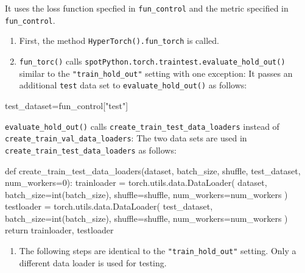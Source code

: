 \documentclass[
  letterpaper,
  DIV=11,
  numbers=noendperiod]{scrreprt}
\newenvironment{Shaded}{\begin{snugshade}}{\end{snugshade}}
\newcommand{\NormalTok}[1]{\textcolor[rgb]{0.00,0.23,0.31}{#1}}
\providecommand{\tightlist}{%
  \setlength{\itemsep}{0pt}\setlength{\parskip}{0pt}}\usepackage{longtable,booktabs,array}
\begin{document}
It uses the loss function specfied in \texttt{fun\_control} and the
metric specified in \texttt{fun\_control}.

\begin{enumerate}
\def\labelenumi{\arabic{enumi}.}
\tightlist
\item
  First, the method \texttt{HyperTorch().fun\_torch} is called.
\item
  \texttt{fun\_torc()} calls
  \texttt{spotPython.torch.traintest.evaluate\_hold\_out()} similar to
  the \texttt{"train\_hold\_out"} setting with one exception: It passes
  an additional \texttt{test} data set to \texttt{evaluate\_hold\_out()}
  as follows:
\end{enumerate}

\begin{Shaded}
\begin{Highlighting}[]
\NormalTok{test\_dataset=fun\_control["test"]}
\end{Highlighting}
\end{Shaded}

\texttt{evaluate\_hold\_out()} calls
\texttt{create\_train\_test\_data\_loaders} instead of
\texttt{create\_train\_val\_data\_loaders}: The two data sets are used
in \texttt{create\_train\_test\_data\_loaders} as follows:

\begin{Shaded}
\begin{Highlighting}[]
\NormalTok{def create\_train\_test\_data\_loaders(dataset, batch\_size, shuffle, test\_dataset, }
\NormalTok{        num\_workers=0):}
\NormalTok{    trainloader = torch.utils.data.DataLoader(}
\NormalTok{        dataset, batch\_size=int(batch\_size), shuffle=shuffle, }
\NormalTok{        num\_workers=num\_workers}
\NormalTok{    )}
\NormalTok{    testloader = torch.utils.data.DataLoader(}
\NormalTok{        test\_dataset, batch\_size=int(batch\_size), shuffle=shuffle, }
\NormalTok{        num\_workers=num\_workers}
\NormalTok{    )}
\NormalTok{    return trainloader, testloader}
\end{Highlighting}
\end{Shaded}

\begin{enumerate}
\def\labelenumi{\arabic{enumi}.}
\setcounter{enumi}{2}
\tightlist
\item
  The following steps are identical to the \texttt{"train\_hold\_out"}
  setting. Only a different data loader is used for testing.
\end{enumerate}
\end{document}
